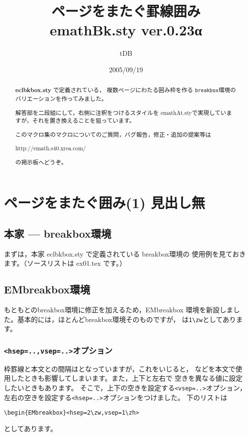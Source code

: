 \documentclass[a4j,fleqn]{jarticle}
\title{ページをまたぐ罫線囲み\\
emathBk.sty {\normalsize ver.0.23α}}
\author{tDB}
\date{2005/09/19}
\begin{document}
\maketitle\thispagestyle{empty}
\begin{abstract}%
\zw%
\textbf{eclbkbox.sty} で定義されている，
複数ページにわたる囲み枠を作る \texttt{breakbox}環境の
バリエーションを作ってみました。

解答部を二段組にして，右側に注釈をつけるスタイルを
\textsf{emathAt.sty}で実現していますが，それを置き換えることを狙っています。

このマクロ集のマクロについてのご質問，バグ報告，修正・追加の提案等は
\begin{center}
http://emath.s40.xrea.com/
\end{center}
の掲示板へどうぞ。
\end{abstract}
\pagebreak

%

\tableofcontents
\pagebreak
{}

\section{ページをまたぐ囲み(1) 見出し無}
\subsection{本家 --- \textsf{breakbox}環境}
まずは，本家 \textsf{eclbkbox.sty} で定義されている \textsf{breakbox}環境の
使用例を見ておきます。（ソースリストは ex01.tex です。）\bigskip



\subsection{\textsf{EMbreakbox}環境}
もともとの\textsf{breakbox}環境に修正を加えるため，\textsf{EMbreakbox}
環境を新設しました。基本的には，ほとんど\textsf{breakbox}環境そのものですが，
は\verb+1\zw+としてあります。



\subsubsection{\texttt{<hsep=..,vsep=..>}オプション}
枠罫線と本文との間隔はとなっていますが，これをいじると，
などを本文で使用したときも影響してしまいます。また，上下と左右で
空きを異なる値に設定したいときもあります。
そこで，上下の空きを設定する\verb+<vsep=..>+オプション，
左右の空きを設定する\verb+<hsep=..>+オプションをつけました。
下のリストは
\begin{jquote}
\begin{verbatim}
\begin{EMbreakbox}<hsep=2\zw,vsep=1\zh>
\end{verbatim}
\end{jquote}
としてあります。
\bigskip
\end{document}
